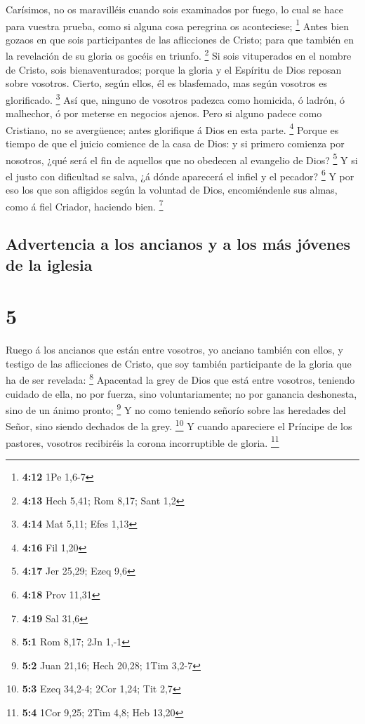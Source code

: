 Carísimos, no os maravilléis cuando sois examinados por
fuego, lo cual se hace para vuestra prueba, como si alguna cosa
peregrina os aconteciese; \footnote{\textbf{4:12} 1Pe 1,6-7}
 Antes bien gozaos en que sois participantes de las
aflicciones de Cristo; para que también en la revelación de su gloria os
gocéis en triunfo. \footnote{\textbf{4:13} Hech 5,41; Rom 8,17; Sant 1,2}
 Si sois vituperados en el nombre de Cristo, sois
bienaventurados; porque la gloria y el Espíritu de Dios reposan sobre
vosotros. Cierto, según ellos, él es blasfemado, mas según vosotros es
glorificado. \footnote{\textbf{4:14} Mat 5,11; Efes 1,13}
 Así que, ninguno de vosotros padezca como homicida, ó
ladrón, ó malhechor, ó por meterse en negocios ajenos. 
Pero si alguno padece como Cristiano, no se avergüence; antes glorifique
á Dios en esta parte. \footnote{\textbf{4:16} Fil 1,20} 
Porque es tiempo de que el juicio comience de la casa de Dios: y si
primero comienza por nosotros, ¿qué será el fin de aquellos que no
obedecen al evangelio de Dios? \footnote{\textbf{4:17} Jer 25,29; Ezeq
  9,6}  Y si el justo con dificultad se salva, ¿á dónde
aparecerá el infiel y el pecador? \footnote{\textbf{4:18} Prov 11,31}
 Y por eso los que son afligidos según la voluntad de
Dios, encomiéndenle sus almas, como á fiel Criador, haciendo bien.
\footnote{\textbf{4:19} Sal 31,6}

\hypertarget{advertencia-a-los-ancianos-y-a-los-muxe1s-juxf3venes-de-la-iglesia}{%
\subsection{Advertencia a los ancianos y a los más jóvenes de la
iglesia}\label{advertencia-a-los-ancianos-y-a-los-muxe1s-juxf3venes-de-la-iglesia}}

\hypertarget{section-4}{%
\section{5}\label{section-4}}

 Ruego á los ancianos que están entre vosotros, yo anciano
también con ellos, y testigo de las aflicciones de Cristo, que soy
también participante de la gloria que ha de ser revelada: \footnote{\textbf{5:1}
  Rom 8,17; 2Jn 1,-1}  Apacentad la grey de Dios que está
entre vosotros, teniendo cuidado de ella, no por fuerza, sino
voluntariamente; no por ganancia deshonesta, sino de un ánimo pronto;
\footnote{\textbf{5:2} Juan 21,16; Hech 20,28; 1Tim 3,2-7}
 Y no como teniendo señorío sobre las heredades del Señor,
sino siendo dechados de la grey. \footnote{\textbf{5:3} Ezeq 34,2-4;
  2Cor 1,24; Tit 2,7}  Y cuando apareciere el Príncipe de
los pastores, vosotros recibiréis la corona incorruptible de gloria.
\footnote{\textbf{5:4} 1Cor 9,25; 2Tim 4,8; Heb 13,20}

